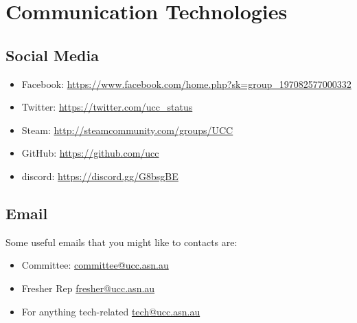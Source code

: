 \chapter{Communication Technologies}\label{Communications}
\newenvironment{ucclist}[1]
{
	\begin{mdframed}[nobreak=true]
	\subsection{#1}
	\begin{mdframed}
		Address:  <\href{mailto:#1@ucc.asn.au}{#1@ucc.asn.au}>
	\end{mdframed}
	\begin{mdframed}
		Subscribe:  \small{\url{http://lists.ucc.asn.au/mailman/listinfo/#1}}
	\end{mdframed}	
}{\end{mdframed}}
\section{Social Media}
\begin{itemize}
	\item Facebook:		\url{https://www.facebook.com/home.php?sk=group_197082577000332}
	\item Twitter:		\url{https://twitter.com/ucc_status}
	\item Steam:		\url{http://steamcommunity.com/groups/UCC}
	\item GitHub:		\url{https://github.com/ucc}
	\item discord:		\url{https://discord.gg/G8bsgBE}
\end{itemize}
\section{Email}
Some useful emails that you might like to contacts are:
\begin{itemize}
	\item Committee:				\href{mailto:committee@ucc.asn.au}{committee@ucc.asn.au}
	\item Fresher Rep				\href{mailto:fresher@ucc.asn.au}{fresher@ucc.asn.au}
	\item For anything tech-related	\href{mailto:tech@ucc.asn.au}{tech@ucc.asn.au}
\end{itemize}
